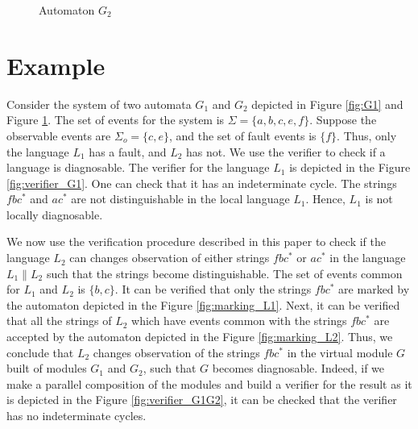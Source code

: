 \documentclass[letterpaper, 10pt, conference]{ieeeconf}
\begin{document}
\begin{figure}[t]
\centering
{}
\caption{Automaton $G_2$}
\label{fig:G2}
\end{figure}


\section{Example}
\label{sec:Example}

Consider the system of two automata $G_1$ and $G_2$ depicted in Figure
\ref{fig:G1} and Figure \ref{fig:G2}. The set of events for the system is
$\Sigma = \{a, b, c, e, f\}$. Suppose the observable events are $\Sigma_o = \{c,
e\}$, and the set of fault events is $\{f\}$. Thus, only the language $L_1$ has a
fault, and $L_2$ has not. We use the verifier \cite{yoo_polynomial-time_2002} to
check if a language is diagnosable. The verifier for the language $L_1$ is
depicted in the Figure \ref{fig:verifier_G1}. One can check that it has an
indeterminate cycle.
The strings $fbc^*$ and $ac^*$ are not distinguishable in the local language
$L_1$. Hence, $L_1$ is not locally diagnosable.

We now use the verification procedure described in this paper to check if the
language $L_2$ can changes observation of either strings $fbc^*$ or
$ac^*$ in the language $L_1 \parallel L_2$ such that the strings become
distinguishable. The set of events common for $L_1$ and $L_2$ is $\{b, c\}$. It
can be verified that only the strings $fbc^*$ are marked by the automaton
depicted in the Figure \ref{fig:marking_L1}. Next, it can be verified that all
the strings of $L_2$ which have events common with the strings $fbc^*$ are
accepted by the automaton depicted in the Figure \ref{fig:marking_L2}. Thus, we
conclude that $L_2$ changes observation of the strings $fbc^*$ in the virtual
module $G$ built of modules $G_1$ and $G_2$, such that $G$ becomes diagnosable.
Indeed, if we make a parallel composition of the modules and build a verifier
for the result as it is depicted in the Figure \ref{fig:verifier_G1G2}, it can
be checked that the verifier has no indeterminate cycles.
\end{document}
